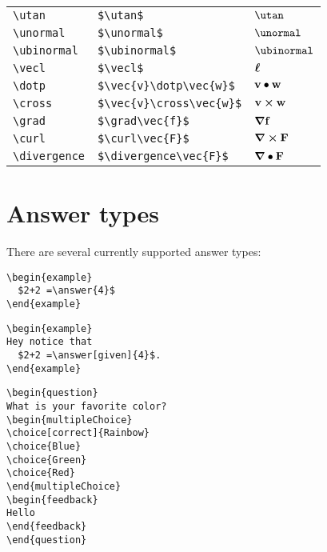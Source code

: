 \documentclass{ximera}
\begin{document}
\begin{tabular*}{1.0\textwidth}{lll}
\verb|\utan| & \verb|$\utan$| & $\utan$\\
\verb|\unormal| & \verb|$\unormal$| & $\unormal$\\
\verb|\ubinormal| & \verb|$\ubinormal$| & $\ubinormal$\\
\verb|\vecl| & \verb|$\vecl$| & $\boldsymbol{\ell}$\\
\verb|\dotp| & \verb|$\vec{v}\dotp\vec{w}$| & $\mathbf{v}\bullet\mathbf{w}$\\
\verb|\cross| & \verb|$\vec{v}\cross\vec{w}$| & $\mathbf{v}\boldsymbol\times\mathbf{w}$\\
\verb|\grad| & \verb|$\grad\vec{f}$| & $\boldsymbol\nabla\mathbf{f}$\\
\verb|\curl| & \verb|$\curl\vec{F}$| & $\boldsymbol\nabla\boldsymbol\times\mathbf{F}$\\
\verb|\divergence| & \verb|$\divergence\vec{F}$| & $\boldsymbol\nabla\bullet\mathbf{F}$\\
\end{tabular*}

\section{Answer types}

There are several currently supported answer types:

\begin{verbatim}
\begin{example}
  $2+2 =\answer{4}$
\end{example}
\end{verbatim}

\begin{verbatim}
\begin{example}
Hey notice that
  $2+2 =\answer[given]{4}$.
\end{example}
\end{verbatim}

\begin{verbatim}
\begin{question}
What is your favorite color?
\begin{multipleChoice}
\choice[correct]{Rainbow}
\choice{Blue}
\choice{Green}
\choice{Red}
\end{multipleChoice}
\begin{feedback}
Hello
\end{feedback}
\end{question}
\end{verbatim}
\end{document}
